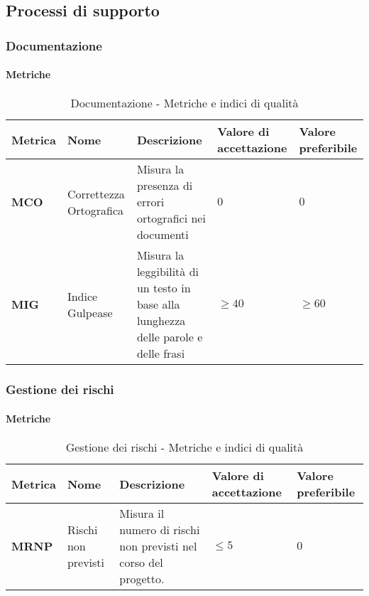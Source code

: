 \subsection{Processi di supporto}
\subsubsection{Documentazione}
\paragraph*{Metriche}
\hspace{1pt}
\begin{table}[H]
    \centering
    \begin{tabular}{|C{1.5cm}|L{3cm}|L{4cm}|L{2.5cm}|L{2.5cm}|}
        \hline
        \textbf{Metrica} & \textbf{Nome} & \textbf{Descrizione} & \textbf{Valore di accettazione} & \textbf{Valore preferibile} \\
        \hline
         \textbf{MCO} & Correttezza Ortografica & Misura la presenza di errori ortografici nei documenti & $0$ & $0$ \\
        \hline
        \textbf{MIG} & Indice Gulpease & Misura la leggibilità di un testo in base alla lunghezza delle parole e delle frasi & $\geq 40$ & $\geq 60$ \\
        \hline
    \end{tabular}
    \caption{Documentazione - Metriche e indici di qualità}
    \label{tab:metriche_testo}
\end{table}


\subsubsection{Gestione dei rischi}
\paragraph*{Metriche}
\hspace{1pt}
\begin{table}[H]
    \centering
    \begin{tabular}{|C{1.5cm}|L{3cm}|L{4cm}|L{2.5cm}|L{2.5cm}|}
        \hline
      \textbf{Metrica} & \textbf{Nome} & \textbf{Descrizione} & \textbf{Valore di accettazione} & \textbf{Valore preferibile} \\
      \hline
      \textbf{MRNP}    & Rischi non previsti   & Misura il numero di rischi non previsti nel corso del progetto. & $\leq 5$ &   $0$ \\
      \hline
    \end{tabular}
    \caption{Gestione dei rischi - Metriche e indici di qualità}
    \label{tab:tabella2}
\end{table}


